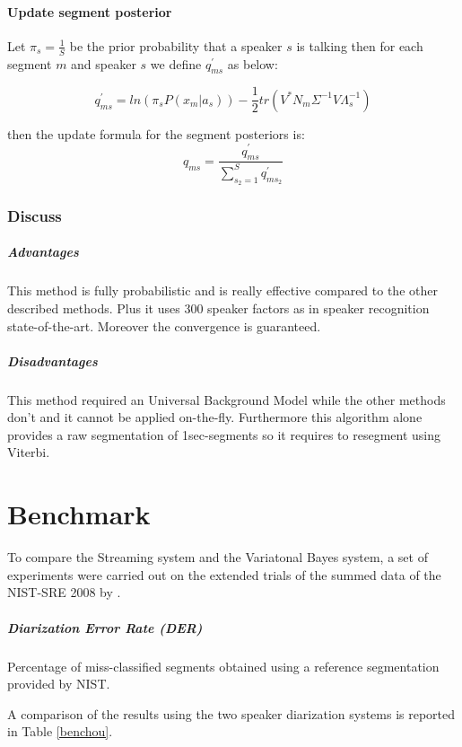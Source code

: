 \documentclass{techrep} %
\begin{document}
\subsubsection{Update segment posterior}
Let $\pi_s = \frac{1}{S}$ be the prior probability that a speaker $s$
is talking then for each segment $m$ and speaker $s$ we define
$q_{ms}^{'}$ as below:

$$q_{ms}^{'} = ln(\pi_sP(x_m|a_s)) - \frac{1}{2}tr(V^*N_m\Sigma^{-1}V\Lambda_s^{-1})$$

then the update formula for the segment posteriors is:
$$q_{ms} = \frac{q_{ms}^{'}}{\sum_{s_2=1}^{S}{q_{ms_2}^{'}}}$$%
\subsection{Discuss}
\paragraph{Advantages} This method is fully probabilistic and is really effective compared to the other described methods. Plus it uses 300 speaker factors as in speaker recognition state-of-the-art. Moreover the convergence is guaranteed.

\paragraph{Disadvantages} This method required an Universal Background Model while the other methods don't and it cannot be applied on-the-fly.
Furthermore this algorithm alone provides a raw segmentation of 1sec-segments so it requires to resegment using Viterbi.

\chapter{Benchmark}

To compare the Streaming system and the Variatonal Bayes system, a set
of experiments were carried out on the extended trials of the summed
data of the NIST-SRE 2008 by \cite{DIAFACT}.


\paragraph{Diarization Error Rate (DER)} Percentage of miss-classified segments obtained using a reference segmentation provided by NIST.

A comparison of the results using the two speaker diarization
systems is reported in Table \ref{benchou}.\\
\end{document}
